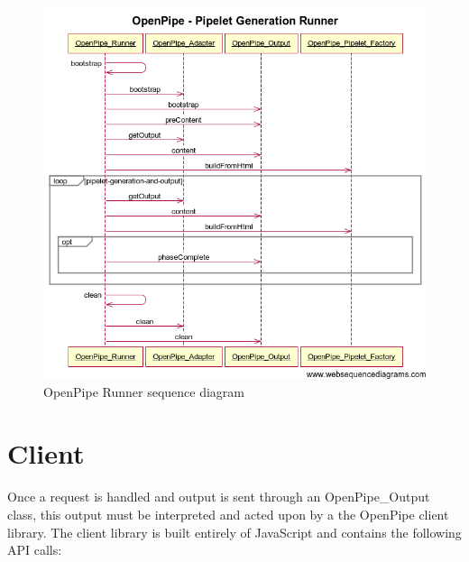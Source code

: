 \documentclass[12pt]{report}
\begin{document}
\begin{figure}[H]
\label{fig:openPipeRunnerSequenceDiagram}
\centering
\includegraphics[width=\textwidth,keepaspectratio]{figures/images/openpipe_runner.png}
\caption{OpenPipe Runner sequence diagram}
\end{figure}

\section{Client}

Once a request is handled and output is sent through an OpenPipe\_Output class, this output must be interpreted and acted upon by a the OpenPipe client library.  The client library is built entirely of JavaScript and contains the following API calls:
\end{document}

